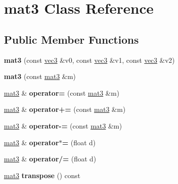 \hypertarget{classmat3}{\section{mat3 Class Reference}
\label{classmat3}
}
\subsection*{Public Member Functions}
\begin{DoxyCompactItemize}
\item 
\hypertarget{classmat3_a5e327d985b68ef2a0cc46fb417aefeaf}{{\bfseries mat3} (const \hyperlink{classvec3}{vec3} \&v0, const \hyperlink{classvec3}{vec3} \&v1, const \hyperlink{classvec3}{vec3} \&v2)}\label{classmat3_a5e327d985b68ef2a0cc46fb417aefeaf}

\item 
\hypertarget{classmat3_a0427bedc9ba6cb374d89618293dda305}{{\bfseries mat3} (const \hyperlink{classmat3}{mat3} \&m)}\label{classmat3_a0427bedc9ba6cb374d89618293dda305}

\item 
\hypertarget{classmat3_a5e2191dc318a5bfbdb45ba695da90a7f}{\hyperlink{classmat3}{mat3} \& {\bfseries operator=} (const \hyperlink{classmat3}{mat3} \&m)}\label{classmat3_a5e2191dc318a5bfbdb45ba695da90a7f}

\item 
\hypertarget{classmat3_a5afea6651ce57716e6e80f90c1001bbd}{\hyperlink{classmat3}{mat3} \& {\bfseries operator+=} (const \hyperlink{classmat3}{mat3} \&m)}\label{classmat3_a5afea6651ce57716e6e80f90c1001bbd}

\item 
\hypertarget{classmat3_af99c2cc186192a7a89ece245ed071762}{\hyperlink{classmat3}{mat3} \& {\bfseries operator-\/=} (const \hyperlink{classmat3}{mat3} \&m)}\label{classmat3_af99c2cc186192a7a89ece245ed071762}

\item 
\hypertarget{classmat3_a0ffea300f2e7f7b43148b242556bf90c}{\hyperlink{classmat3}{mat3} \& {\bfseries operator$\ast$=} (float d)}\label{classmat3_a0ffea300f2e7f7b43148b242556bf90c}

\item 
\hypertarget{classmat3_ab13aff14d959bd6f7bf938c0fbdd5643}{\hyperlink{classmat3}{mat3} \& {\bfseries operator/=} (float d)}\label{classmat3_ab13aff14d959bd6f7bf938c0fbdd5643}

\item 
\hypertarget{classmat3_a37e0d98b86201148018d5f6ebefed605}{\hyperlink{classmat3}{mat3} {\bfseries transpose} () const }\label{classmat3_a37e0d98b86201148018d5f6ebefed605}


\end{DoxyCompactItemize}
